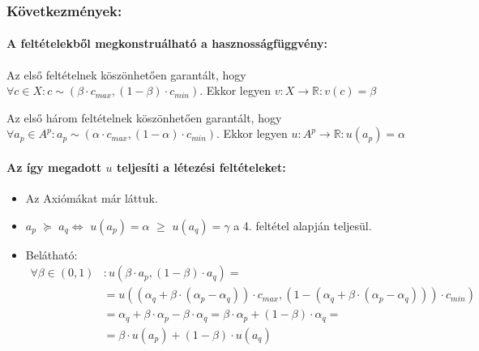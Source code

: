 \documentclass[a4paper,12pt]{article}
\begin{document}
\subsubsection{Következmények: }

\paragraph{A feltételekből megkonstruálható a hasznosságfüggvény: }

Az első feltételnek köszönhetően garantált, hogy $\forall c \in X: c \sim (\beta \cdot c_{max}, (1-\beta) \cdot c_{min})$. Ekkor legyen $v: X \rightarrow \mathbb{R} : v(c) = \beta$


Az első három feltételnek köszönhetően garantált, hogy $\forall a_p \in A^p: a_p \sim (\alpha \cdot c_{max}, (1-\alpha)\cdot c_{min})$. Ekkor legyen $u: A^p \rightarrow \mathbb{R} : u(a_p) = \alpha$ 


\paragraph{Az így megadott $u$ teljesíti a létezési feltételeket: }
\begin{itemize}
\item Az Axiómákat már láttuk. 
\item $a_p$  $\succeq$ $a_q \Leftrightarrow $ $u(a_p) = \alpha$  $\geq$ $u(a_q) = \gamma$ a 4. feltétel alapján teljesül.
\item Belátható: \begin{equation}
\begin{split} 
\forall  \beta \in (0,1)&: u(\beta\cdot a_p , (1-\beta)\cdot a_q ) = \\
 & = u((\alpha_q + \beta\cdot (\alpha_p - \alpha_q ))\cdot c_{max},(1 - (\alpha_q + \beta\cdot (\alpha_p - \alpha_q )))\cdot c_{min}) \\
 & = \alpha_q + \beta\cdot \alpha_p - \beta\cdot \alpha_q = \beta\cdot \alpha_p + (1-\beta) \cdot  \alpha_q = \\
 & =  \beta\cdot u(a_p) + (1-\beta)\cdot u(a_q)\\
\end{split}
\end{equation} 
\end{itemize}
\end{document}
